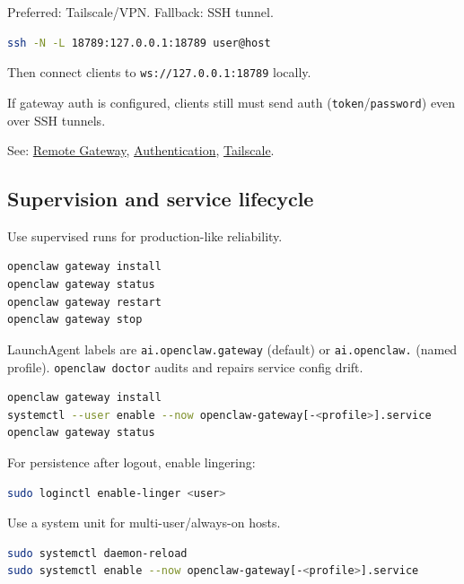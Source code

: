 Preferred: Tailscale/VPN.
Fallback: SSH tunnel.

\begin{lstlisting}[language=bash]
ssh -N -L 18789:127.0.0.1:18789 user@host
\end{lstlisting}


Then connect clients to \texttt{ws://127.0.0.1:18789} locally.

If gateway auth is configured, clients still must send auth (\texttt{token}/\texttt{password}) even over SSH tunnels.

See: \href{/gateway/remote}{Remote Gateway}, \href{/gateway/authentication}{Authentication}, \href{/gateway/tailscale}{Tailscale}.

\subsection{Supervision and service lifecycle}


Use supervised runs for production-like reliability.


\begin{lstlisting}[language=bash]
openclaw gateway install
openclaw gateway status
openclaw gateway restart
openclaw gateway stop
\end{lstlisting}


LaunchAgent labels are \texttt{ai.openclaw.gateway} (default) or \texttt{ai.openclaw.} (named profile). \texttt{openclaw doctor} audits and repairs service config drift.



\begin{lstlisting}[language=bash]
openclaw gateway install
systemctl --user enable --now openclaw-gateway[-<profile>].service
openclaw gateway status
\end{lstlisting}


For persistence after logout, enable lingering:

\begin{lstlisting}[language=bash]
sudo loginctl enable-linger <user>
\end{lstlisting}




Use a system unit for multi-user/always-on hosts.

\begin{lstlisting}[language=bash]
sudo systemctl daemon-reload
sudo systemctl enable --now openclaw-gateway[-<profile>].service
\end{lstlisting}



